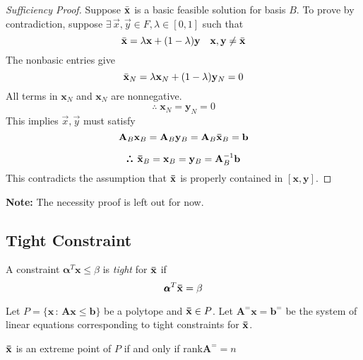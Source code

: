 \begin{proof}[Sufficiency Proof] 
Suppose $\Bar{\mathbf{x}}$ is a basic feasible solution for basis $B$. To prove by contradiction, suppose $\exists \, \Vec{x},\Vec{y} \in F, \lambda \in [0,1]$ such that
\begin{equation*}
    \Bar{\mathbf{x}} = \lambda \mathbf{x} + (1-\lambda) \mathbf{y} \quad \mathbf{x},\mathbf{y}\neq\Bar{\mathbf{x}}
\end{equation*}
The nonbasic entries give
\begin{equation*}
    \Bar{\mathbf{x}}_N = \lambda \mathbf{x}_N + (1-\lambda) \mathbf{y}_N = 0
\end{equation*}
All terms in $\mathbf{x}_N$ and $\mathbf{x}_N$ are nonnegative.
\begin{equation*}
    \therefore \;\mathbf{x}_N = \mathbf{y}_N = 0
\end{equation*}
This implies $\Vec{x},\Vec{y}$ must satisfy
\begin{equation*}
\mathbf{A}_B\mathbf{x}_B = \mathbf{A}_B\mathbf{y}_B = \mathbf{A}_B\mathbf{\Bar{x}}_B = \mathbf{b}
\end{equation*}

\begin{equation*}
    \therefore \;\mathbf{\Bar{x}}_B = \mathbf{x}_B = \mathbf{y}_B = \mathbf{A}_B^{-1} \mathbf{b}
\end{equation*}
This contradicts the assumption that $\mathbf{\Bar{x}}$ is properly contained in $[\mathbf{x},\mathbf{y}]$.
\end{proof}
\textbf{Note:} The necessity proof is left out for now.

\subsection{Tight Constraint}
A constraint $\pmb{\alpha}^T\mathbf{x} \leq \beta$ is \emph{tight} for $\mathbf{\Bar{x}}$ if
\begin{equation*}
    \pmb{\alpha}^T\mathbf{\Bar{x}} = \beta
\end{equation*}
\begin{theorem}
Let $P=\{\mathbf{x}\,:\,\mathbf{Ax\leq b}\}$ be a polytope and $\mathbf{\Bar{x}}\in P$. Let $\mathbf{A}^=\mathbf{x} = \mathbf{b}^=$ be the system of linear equations corresponding to tight constraints for $\mathbf{\Bar{x}}$.

$\mathbf{\Bar{x}}$ is an extreme point of $P$ if and only if \textnormal{rank}$\mathbf{A}^= = n$
\end{theorem}
